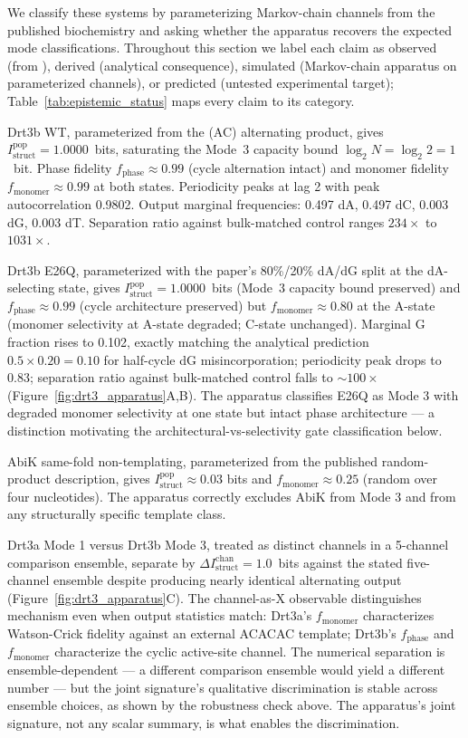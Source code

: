 \documentclass[aps,prx,reprint,amsmath,amssymb,floatfix,superscriptaddress,nofootinbib]{revtex4-2}
\theoremstyle{plain-thm}
\theoremstyle{definition-thm}
\newcommand{\Istructpop}{I_{\mathrm{struct}}^{\mathrm{pop}}}
\newcommand{\Istructchan}{I_{\mathrm{struct}}^{\mathrm{chan}}}
\newcommand{\fphase}{f_{\mathrm{phase}}}
\newcommand{\fmonomer}{f_{\mathrm{monomer}}}
\begin{document}
We classify these systems by parameterizing Markov-chain channels from the published biochemistry and asking whether the apparatus recovers the expected mode classifications. Throughout this section we label each claim as observed (from \citet{Deng2026}), derived (analytical consequence), simulated (Markov-chain apparatus on parameterized channels), or predicted (untested experimental target); Table~\ref{tab:epistemic_status} maps every claim to its category.

Drt3b WT, parameterized from the (AC) alternating product, gives $\Istructpop = 1.0000$~bits, saturating the Mode~3 capacity bound $\log_2 N = \log_2 2 = 1$~bit. Phase fidelity $\fphase \approx 0.99$ (cycle alternation intact) and monomer fidelity $\fmonomer \approx 0.99$ at both states. Periodicity peaks at lag 2 with peak autocorrelation 0.9802. Output marginal frequencies: 0.497 dA, 0.497 dC, 0.003 dG, 0.003 dT. Separation ratio against bulk-matched control ranges $234\times$ to $1031\times$.

Drt3b E26Q, parameterized with the paper's 80\%/20\% dA/dG split at the dA-selecting state, gives $\Istructpop = 1.0000$~bits (Mode~3 capacity bound preserved) and $\fphase \approx 0.99$ (cycle architecture preserved) but $\fmonomer \approx 0.80$ at the A-state (monomer selectivity at A-state degraded; C-state unchanged). Marginal G fraction rises to 0.102, exactly matching the analytical prediction $0.5 \times 0.20 = 0.10$ for half-cycle dG misincorporation; periodicity peak drops to 0.83; separation ratio against bulk-matched control falls to $\sim 100\times$ (Figure~\ref{fig:drt3_apparatus}A,B). The apparatus classifies E26Q as Mode 3 with degraded monomer selectivity at one state but intact phase architecture --- a distinction motivating the architectural-vs-selectivity gate classification below.

AbiK same-fold non-templating, parameterized from the published random-product description, gives $\Istructpop \approx 0.03$ bits and $\fmonomer \approx 0.25$ (random over four nucleotides). The apparatus correctly excludes AbiK from Mode 3 and from any structurally specific template class.

Drt3a Mode 1 versus Drt3b Mode 3, treated as distinct channels in a 5-channel comparison ensemble, separate by $\Delta\Istructchan = 1.0$~bits against the stated five-channel ensemble despite producing nearly identical alternating output (Figure~\ref{fig:drt3_apparatus}C). The channel-as-X observable distinguishes mechanism even when output statistics match: Drt3a's $\fmonomer$ characterizes Watson-Crick fidelity against an external ACACAC template; Drt3b's $\fphase$ and $\fmonomer$ characterize the cyclic active-site channel. The numerical separation is ensemble-dependent --- a different comparison ensemble would yield a different number --- but the joint signature's qualitative discrimination is stable across ensemble choices, as shown by the robustness check above. The apparatus's joint signature, not any scalar summary, is what enables the discrimination.
\end{document}
